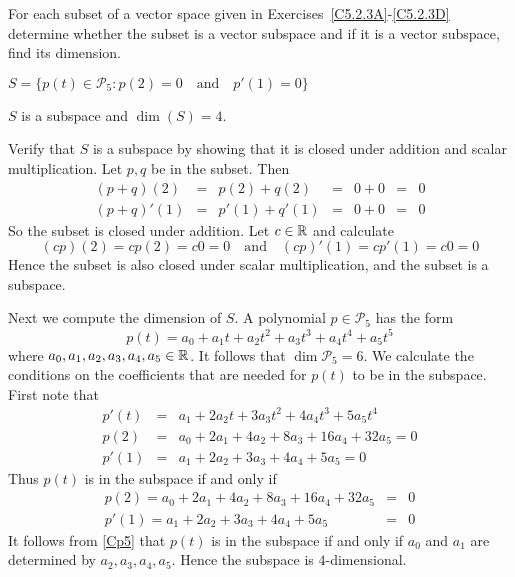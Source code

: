 \documentclass{ximera}
\author{Marty Golubitsky}
\begin{document}
For each subset of a vector space given in Exercises~\eqref{C5.2.3A}-\eqref{C5.2.3D} determine whether the subset is a vector subspace and if it is a vector subspace, find its dimension.

\begin{exercise}\label{C5.2.3A}

$S = \{p(t)\in\mathcal{P}_5 : p(2) = 0 \quad\mbox{and}\quad p'(1) = 0 \}$

\begin{solution}

\ans $S$ is a subspace and $\dim(S)=4$.

\soln
Verify that $S$ is a subspace by showing that it is closed under addition and scalar multiplication.  Let $p,q$ be in the subset.  Then
\[
\begin{array}{rclclcl}
(p+q)(2) & = & p(2)+q(2) & = & 0 + 0 & = & 0 \\
(p+q)'(1) & = & p'(1)+q'(1) & = & 0 + 0 & = & 0
\end{array}
\]
So the subset is closed under addition. Let $c\in\mbox{$\Bbb{R}$}$ and calculate
\[
(cp)(2) = cp(2) = c0 = 0  \quad\mbox{and} \quad (cp)'(1) = cp'(1) = c0 = 0
\]
Hence the subset is also closed under scalar multiplication, and the subset is a subspace.

Next we compute the dimension of $S$.  A polynomial $p\in \mathcal{P}_5 $ has the form 
\[
p(t) = a_0 + a_1t + a_2t^2 + a_3 t^3 + a_4t^4 + a_5t^5
\]
where $a_0,a_1,a_2,a_3,a_4,a_5\in\mbox{$\Bbb{R}$}$.  It follows that $\dim\mathcal{P}_5 = 6$. 
We calculate the conditions on the coefficients that are needed for $p(t)$ to be in the subspace.  First note that 
\[
\begin{array}{rcl}
p'(t) & = & a_1 + 2a_2t + 3a_3 t^2 + 4a_4t^3 + 5a_5t^4\\
p(2) & = & a_0 + 2a_1 + 4a_2 + 8a_3  + 16a_4 + 32a_5 = 0\\
p'(1) & = & a_1 + 2a_2 + 3a_3 + 4a_4 + 5a_5 = 0
\end{array}
\]
Thus $p(t)$ is in the subspace if and only if
\begin{equation} \label{Cp5}
\begin{array}{rcl}
p(2) = a_0 + 2a_1 + 4a_2 + 8a_3  + 16a_4 + 32a_5 & = & 0\\
p'(1)= a_1 + 2a_2 + 3a_3 + 4a_4 + 5a_5 & = & 0
\end{array}
\end{equation}
It follows from \eqref{Cp5} that $p(t)$ is in the subspace if and only if $a_0$ and $a_1$ are determined by $a_2,a_3,a_4,a_5$.  Hence the subspace is $4$-dimensional.
\end{solution}
\end{exercise}
\end{document}
